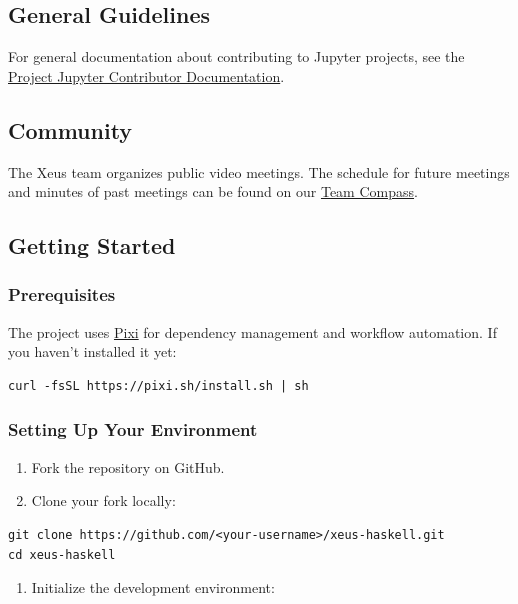 \documentclass[11pt]{scrartcl}
\begin{document}
\subsection{General Guidelines}


For general documentation about contributing to Jupyter projects, see the \href{https://jupyter.readthedocs.io/en/latest/contributor/content-contributor.html}{Project Jupyter Contributor Documentation}.
\subsection{Community}


The Xeus team organizes public video meetings. The schedule for future meetings and minutes of past meetings can be found on our \href{https://jupyter-xeus.github.io/}{Team Compass}.
\subsection{Getting Started}


\subsubsection{Prerequisites}


The project uses \href{https://pixi.sh/}{Pixi} for dependency management and workflow automation. If you haven't installed it yet:
\begin{verbatim}
curl -fsSL https://pixi.sh/install.sh | sh
\end{verbatim}


\subsubsection{Setting Up Your Environment}


\begin{enumerate}
\item Fork the repository on GitHub.
\item Clone your fork locally:
\end{enumerate}


\begin{verbatim}
git clone https://github.com/<your-username>/xeus-haskell.git
cd xeus-haskell
\end{verbatim}


\begin{enumerate}
\item Initialize the development environment:
\end{enumerate}
\end{document}
